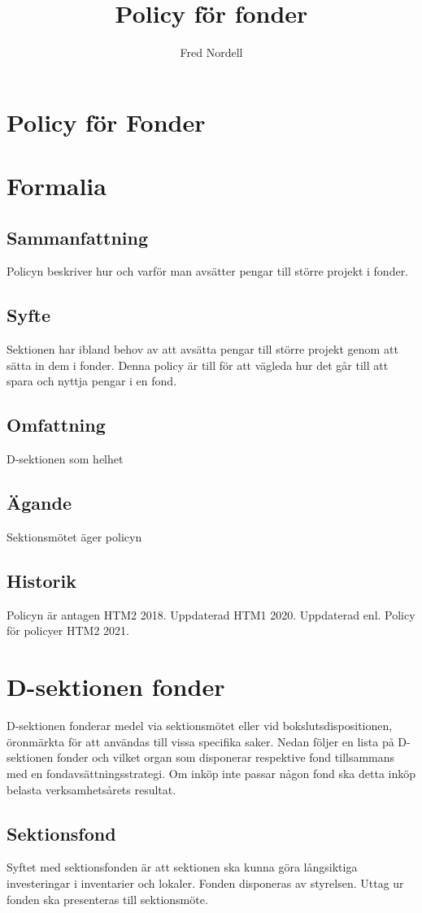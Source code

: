 \documentclass{dsekprotokoll}
\title{Policy för fonder}
\author{Fred Nordell}
\begin{document}
\section*{Policy för Fonder}
\section{Formalia}
\subsection{Sammanfattning}
Policyn beskriver hur och varför man avsätter pengar till större projekt i fonder.
\subsection{Syfte}
Sektionen har ibland behov av att avsätta pengar till större projekt genom att sätta in dem i fonder.
Denna policy är till för att vägleda hur det går till att spara och nyttja pengar i en fond.
\subsection{Omfattning}
D-sektionen som helhet
\subsection{Ägande}
Sektionsmötet äger policyn
\subsection{Historik}
Policyn är antagen HTM2 2018.
Uppdaterad HTM1 2020.
Uppdaterad enl. Policy för policyer HTM2 2021.

\section{D-sektionen fonder}
D-sektionen fonderar medel via sektionsmötet eller vid bokslutsdispositionen, öronmärkta för
att användas till vissa specifika saker. Nedan följer en lista på D-sektionen fonder och vilket organ som disponerar respektive fond tillsammans med en fondavsättningsstrategi. Om inköp inte passar
någon fond ska detta inköp belasta verksamhetsårets resultat.

\subsection{Sektionsfond}
Syftet med sektionsfonden är att sektionen ska kunna göra långsiktiga investeringar i inventarier och lokaler. Fonden disponeras av styrelsen. Uttag ur fonden ska presenteras
till sektionsmöte.
\end{document}
